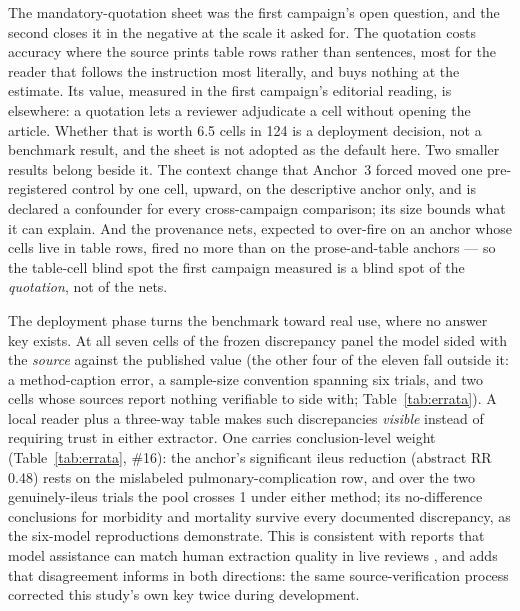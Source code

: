 \documentclass[11pt]{article}
\begin{document}
The mandatory-quotation sheet was the first campaign's open question, and the second closes it in the negative at the scale it asked for. The quotation costs accuracy where the source prints table rows rather than sentences, most for the reader that follows the instruction most literally, and buys nothing at the estimate. Its value, measured in the first campaign's editorial reading, is elsewhere: a quotation lets a reviewer adjudicate a cell without opening the article. Whether that is worth 6.5 cells in 124 is a deployment decision, not a benchmark result, and the sheet is not adopted as the default here. Two smaller results belong beside it. The context change that Anchor~3 forced moved one pre-registered control by one cell, upward, on the descriptive anchor only, and is declared a confounder for every cross-campaign comparison; its size bounds what it can explain. And the provenance nets, expected to over-fire on an anchor whose cells live in table rows, fired no more than on the prose-and-table anchors --- so the table-cell blind spot the first campaign measured is a blind spot of the \emph{quotation}, not of the nets.

The deployment phase turns the benchmark toward real use, where no answer key exists. At all seven cells of the frozen discrepancy panel the model sided with the \emph{source} against the published value (the other four of the eleven fall outside it: a method-caption error, a sample-size convention spanning six trials, and two cells whose sources report nothing verifiable to side with; Table~\ref{tab:errata}). A local reader plus a three-way table makes such discrepancies \emph{visible} instead of requiring trust in either extractor. One carries conclusion-level weight (Table~\ref{tab:errata}, \#16): the anchor's significant ileus reduction (abstract RR 0.48) rests on the mislabeled pulmonary-complication row, and over the two genuinely-ileus trials the pool crosses 1 under either method; its no-difference conclusions for morbidity and mortality survive every documented discrepancy, as the six-model reproductions demonstrate. This is consistent with reports that model assistance can match human extraction quality in live reviews \citep{lee2026noninferiority}, and adds that disagreement informs in both directions: the same source-verification process corrected this study's own key twice during development. 
\end{document}
